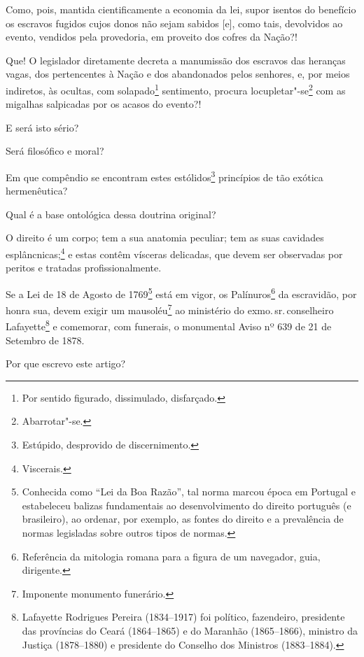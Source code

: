 Como, pois, mantida cientificamente a economia da lei, supor isentos do
benefício os escravos fugidos cujos donos não sejam sabidos {[}e{]},
como tais, devolvidos ao evento, vendidos pela provedoria, em proveito
dos cofres da Nação?!

Que! O legislador diretamente decreta a manumissão dos escravos das
heranças vagas, dos pertencentes à Nação e dos abandonados pelos
senhores, e, por meios indiretos, às ocultas, com solapado\footnote{
  Por sentido figurado, dissimulado, disfarçado.} sentimento, procura
locupletar"-se\footnote{Abarrotar"-se.} com as migalhas salpicadas por
os acasos do evento?!

E será isto sério?

Será filosófico e moral?

Em que compêndio se encontram estes estólidos\footnote{Estúpido,
  desprovido de discernimento.} princípios de tão exótica hermenêutica?

Qual é a base ontológica dessa doutrina original?

O direito é um corpo; tem a sua anatomia peculiar; tem as suas cavidades
esplâncnicas;\footnote{Viscerais.} e estas contêm vísceras delicadas,
que devem ser observadas por peritos e tratadas profissionalmente.

Se a Lei de 18 de Agosto de 1769\footnote{Conhecida como ``Lei da Boa
  Razão'', tal norma marcou época em Portugal e estabeleceu balizas
  fundamentais ao desenvolvimento do direito português (e brasileiro),
  ao ordenar, por exemplo, as fontes do direito e a prevalência de
  normas legisladas sobre outros tipos de normas.} está em vigor, os
Palínuros\footnote{Referência da mitologia romana para a figura de um
  navegador, guia, dirigente.} da escravidão, por honra sua, devem
exigir um mausoléu\footnote{Imponente monumento funerário.} ao
ministério do exmo.\,sr.\,conselheiro Lafayette\footnote{Lafayette
  Rodrigues Pereira (1834--1917) foi político, fazendeiro, presidente
  das províncias do Ceará (1864--1865) e do Maranhão (1865--1866),
  ministro da Justiça (1878--1880) e presidente do Conselho dos Ministros
  (1883--1884).} e comemorar, com funerais, o monumental Aviso nº 639 de
21 de Setembro de 1878.

\asterisc

Por que escrevo este artigo?


